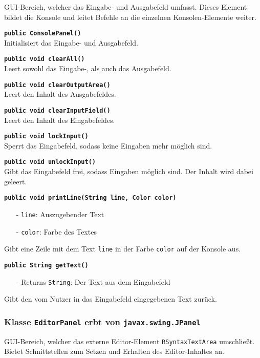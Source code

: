\documentclass[parskip=full,11pt,twoside]{scrartcl}
\begin{document}
GUI-Bereich, welcher das Eingabe- und Ausgabefeld umfasst. Dieses Element bildet die Konsole und leitet Befehle an die einzelnen Konsolen-Elemente weiter.

\textbf{\texttt{public ConsolePanel()}}\\
Initialisiert das Eingabe- und Ausgabefeld.

\textbf{\texttt{public void clearAll()}}\\
Leert sowohl das Eingabe-, als auch das Ausgabefeld.

\textbf{\texttt{public void clearOutputArea()}}\\
Leert den Inhalt des Ausgabefeldes.

\textbf{\texttt{public void clearInputField()}}\\
Leert den Inhalt des Eingabefeldes.

\textbf{\texttt{public void lockInput()}}\\
Sperrt das Eingabefeld, sodass keine Eingaben mehr möglich sind.

\textbf{\texttt{public void unlockInput()}}\\
Gibt das Eingabefeld frei, sodass Eingaben möglich sind. Der Inhalt wird dabei geleert.

\textbf{\texttt{public void printLine(String line, Color color)}}
\begin{itemize}[noitemsep]
	\item[-] \texttt{line}: Auszugebender Text
	\item[-] \texttt{color}: Farbe des Textes
\end{itemize}
Gibt eine Zeile mit dem Text \texttt{line} in der Farbe \texttt{color} auf der Konsole aus.

\textbf{\texttt{public String getText()}}
\begin{itemize}[noitemsep]
	\item[-] Returns \texttt{String}: Der Text aus dem Eingabefeld
\end{itemize}
Gibt den vom Nutzer in das Eingabefeld eingegebenen Text zurück.

\subsubsection{Klasse \texttt{EditorPanel} erbt von \texttt{javax.swing.JPanel}}

GUI-Bereich, welcher das externe Editor-Element \texttt{RSyntaxTextArea} umschließt. Bietet Schnittstellen zum Setzen und Erhalten des Editor-Inhaltes an.
\end{document}
